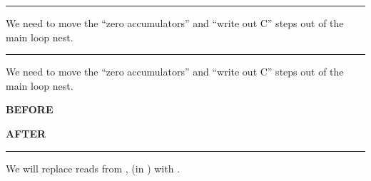 \vfill
\hrule
\vfill

{\LARGE
We need to move the ``zero accumulators'' and ``write out C'' steps out of the main loop nest.

}


\newpage
{}

{\large

}

\vfill
\hrule
\vfill

{\LARGE
We need to move the ``zero accumulators'' and ``write out C'' steps out of the main loop nest.

}


\newpage
{}

\begin{minipage}[t]{0.48\textwidth}\fixminipage
{\LARGE
\textbf{BEFORE}
}

{\large

}
\end{minipage}
\hfill
\begin{minipage}[t]{0.48\textwidth}\fixminipage
{\LARGE
\textbf{AFTER}
}

{\large

}
\end{minipage}



\newpage
{\large

}

\newpage
{\large

}

\newpage
{\large

}

\newpage
{\large

}

\newpage
{}

{\large

}

\vspace{3mm}
\hrule

{\LARGE
We will replace reads from ,  (in ) with .

}
\vspace{-4mm}

\begin{center}
\Large
\begin{tikzpicture}[node distance=0mm]

\end{tikzpicture}
\end{center}


